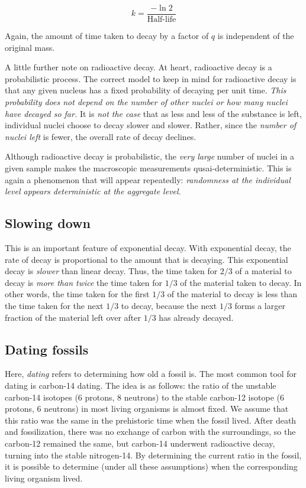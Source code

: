 \documentclass{amsart}
\begin{document}
$$k = \frac{- \ln 2}{\text{Half-life}}$$

Again, the amount of time taken to decay by a factor of $q$ is
independent of the original mass.

A little further note on radioactive decay. At heart, radioactive
decay is a probabilistic process. The correct model to keep in mind
for radioactive decay is that any given nucleus has a fixed
probability of decaying per unit time. {\em This probability does not
depend on the number of other nuclei or how many nuclei have decayed
so far.} It is {\em not the case} that as less and less of the
substance is left, individual nuclei choose to decay slower and
slower. Rather, since the {\em number of nuclei left} is fewer, the
overall rate of decay declines.

Although radioactive decay is probabilistic, the {\em very large}
number of nuclei in a given sample makes the macroscopic measurements
qusai-deterministic. This is again a phenomenon that will appear
repeatedly: {\em randomness at the individual level appears
deterministic at the aggregate level.}

\subsection{Slowing down}

This is an important feature of exponential decay. With exponential
decay, the rate of decay is proportional to the amount that is
decaying. This exponential decay is {\em slower} than linear
decay. Thus, the time taken for $2/3$ of a material to decay is {\em
more than twice} the time taken for $1/3$ of the material taken to
decay. In other words, the time taken for the first $1/3$ of the
material to decay is less than the time taken for the next $1/3$ to
decay, because the next $1/3$ forms a larger fraction of the material
left over after $1/3$ has already decayed.

\subsection{Dating fossils}

Here, {\em dating} refers to determining how old a fossil is. The most
common tool for dating is carbon-14 dating. The idea is as follows:
the ratio of the unstable carbon-14 isotopes (6 protons, 8 neutrons)
to the stable carbon-12 isotope (6 protons, 6 neutrons) in most living
organisms is almost fixed. We assume that this ratio was the same in
the prehistoric time when the fossil lived. After death and
fossilization, there was no exchange of carbon with the surroundings,
so the carbon-12 remained the same, but carbon-14 underwent
radioactive decay, turning into the stable nitrogen-14. By determining
the current ratio in the fossil, it is possible to determine (under
all these assumptions) when the corresponding living organism lived.
\end{document}
